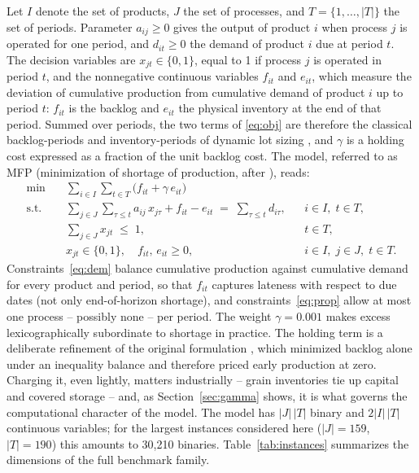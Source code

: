 Let $I$ denote the set of products, $J$ the set of processes, and
$T=\{1,\dots,|T|\}$ the set of periods. Parameter $a_{ij}\ge 0$ gives
the output of product $i$ when process $j$ is operated for one
period, and $d_{it}\ge 0$ the demand of product $i$ due at period
$t$. The decision variables are $x_{jt}\in\{0,1\}$, equal to 1 if
process $j$ is operated in period $t$, and the nonnegative continuous
variables $f_{it}$ and $e_{it}$, which measure the deviation of
cumulative production from cumulative demand of product $i$ up to
period $t$: $f_{it}$ is the backlog and $e_{it}$ the physical
inventory at the end of that period. Summed over periods, the two
terms of \eqref{eq:obj} are therefore the classical backlog-periods
and inventory-periods of dynamic lot sizing
\citep{pochet2006production}, and $\gamma$ is a holding cost expressed
as a fraction of the unit backlog cost. The model, referred to as
MFP (minimization of shortage of production, after
\citealp{luche2009combining}), reads:
%
\begin{align}
\min \quad & \sum_{i\in I}\sum_{t\in T}\bigl(f_{it} + \gamma\, e_{it}\bigr)
  \label{eq:obj}\\
\text{s.t.} \quad
& \sum_{j\in J}\sum_{\tau\le t} a_{ij}\, x_{j\tau} + f_{it} - e_{it}
  \;=\; \sum_{\tau\le t} d_{i\tau},
  && i\in I,\; t\in T, \label{eq:dem}\\
& \sum_{j\in J} x_{jt} \;\le\; 1, && t\in T, \label{eq:prop}\\
& x_{jt}\in\{0,1\},\quad f_{it},\,e_{it}\ge 0, && i\in I,\; j\in J,\;
  t\in T. \label{eq:dom}
\end{align}
%
Constraints~\eqref{eq:dem} balance cumulative production against
cumulative demand for every product and period, so that $f_{it}$
captures lateness with respect to due dates (not only end-of-horizon
shortage), and constraints~\eqref{eq:prop} allow at most one process
-- possibly none -- per period. The weight $\gamma=0.001$ makes
excess lexicographically subordinate to shortage in practice. The
holding term is a deliberate refinement of the original formulation
\citep{luche2009combining}, which minimized backlog alone under an
inequality balance and therefore priced early production at zero.
Charging it, even lightly, matters industrially -- grain inventories
tie up capital and covered storage -- and, as
Section~\ref{sec:gamma} shows, it is what governs the computational
character of the model. The
model has $|J|\,|T|$ binary and $2|I|\,|T|$ continuous variables; for
the largest instances considered here ($|J|=159$, $|T|=190$) this
amounts to 30{,}210 binaries. Table~\ref{tab:instances} summarizes
the dimensions of the full benchmark family.

